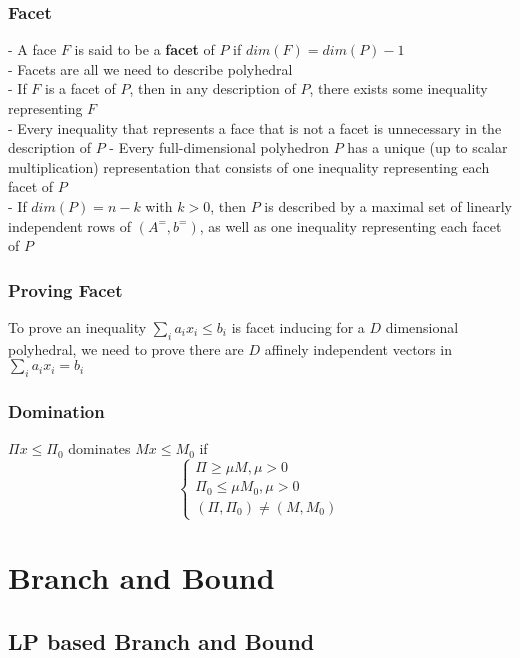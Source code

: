 			\subsection{Facet}
				- A face $F$ is said to be a \textbf{facet} of $P$ if $dim(F) = dim(P)-1$\\
				- Facets are all we need to describe polyhedral\\
				- If $F$ is a facet of $P$, then in any description of $P$, there exists some inequality representing $F$\\
				- Every inequality that represents a face that is not a facet is unnecessary in the description of $P$
				- Every full-dimensional polyhedron $P$ has a unique (up to scalar multiplication) representation that consists of one inequality representing each facet of $P$\\
				- If $dim(P) = n-k$ with $k>0$, then $P$ is described by a maximal set of linearly independent rows of $(A^=, b^=)$, as well as one inequality representing each facet of $P$
				
			\subsection{Proving Facet}
				To prove an inequality $\sum_i a_i x_i \le b_i$ is facet inducing for a $D$ dimensional polyhedral, we need to prove there are $D$ affinely independent vectors in $\sum_i a_i x_i = b_i$

			\subsection{Domination}
				$\Pi x\le \Pi_0$ dominates $Mx\le M_0$ if
				\begin{equation}
					\begin{cases}
						\Pi \ge \mu M, \mu > 0\\
						\Pi_0 \le \mu M_0, \mu > 0\\
						(\Pi, \Pi_0) \ne (M, M_0)
					\end{cases}
				\end{equation}

	\chapter{Branch and Bound}
		\section{LP based Branch and Bound}
